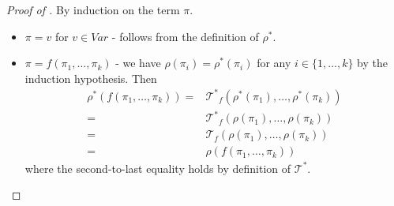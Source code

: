 \documentclass{article}
\begin{document}
\begin{proof}[Proof of ]
    By induction on the term $\pi$.
    \begin{itemize}
        \item $\pi = v$ for $v \in \mathit{Var}$ - follows from the definition of $\rho^*$.
        \item $\pi = f(\pi_1, \ldots, \pi_k)$ - we have $\rho(\pi_i) = \rho^*(\pi_i)$ for any $i \in \{ 1, \ldots, k \}$
              by the induction hypothesis.
              Then
              \begin{align*}
                  \rho^*(f(\pi_1, \ldots, \pi_k)) 
                  = & {\mathcal{T}^*}_f(\rho^*(\pi_1), \ldots, \rho^*(\pi_k)) \\
                  = & {\mathcal{T}^*}_f(\rho(\pi_1), \ldots, \rho(\pi_k)) \\
                  = & \mathcal{T}_f(\rho(\pi_1), \ldots, \rho(\pi_k)) \\
                  = & \rho(f(\pi_1, \ldots, \pi_k))
              \end{align*}
              where the second-to-last equality holds by definition of $\mathcal{T}^*$.
    \end{itemize}
\end{proof}
\end{document}
